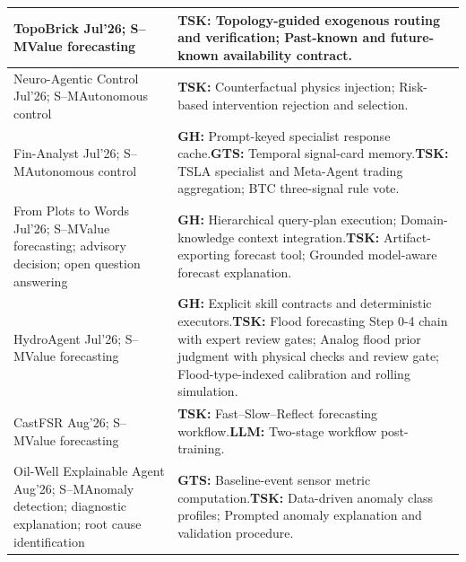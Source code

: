 \documentclass[preprints,article,submit,moreauthors]{Definitions/mdpi}
\newcommand{\typeSMshort}{\textsf{S--M}}
\begin{document}
\begin{longtable}{@{}>{\raggedright\arraybackslash}p{}p{}@{}}
TopoBrick \citep{topobrick2026} Jul'26; \typeSMshort{}\newline Value forecasting & \textbf{TSK:} Topology-guided exogenous routing and verification; Past-known and future-known availability contract.\\\midrule
Neuro-Agentic Control \citep{neuroagentic2026} Jul'26; \typeSMshort{}\newline Autonomous control & \textbf{TSK:} Counterfactual physics injection; Risk-based intervention rejection and selection.\\\midrule
Fin-Analyst \citep{finanalyst2026} Jul'26; \typeSMshort{}\newline Autonomous control & \textbf{GH:} Prompt-keyed specialist response cache.\newline\textbf{GTS:} Temporal signal-card memory.\newline\textbf{TSK:} TSLA specialist and Meta-Agent trading aggregation; BTC three-signal rule vote.\\\midrule
From Plots to Words \citep{plotstowords2026} Jul'26; \typeSMshort{}\newline Value forecasting; advisory decision; open question answering & \textbf{GH:} Hierarchical query-plan execution; Domain-knowledge context integration.\newline\textbf{TSK:} Artifact-exporting forecast tool; Grounded model-aware forecast explanation.\\\midrule
HydroAgent \citep{hydroagent2026} Jul'26; \typeSMshort{}\newline Value forecasting & \textbf{GH:} Explicit skill contracts and deterministic executors.\newline\textbf{TSK:} Flood forecasting Step 0-4 chain with expert review gates; Analog flood prior judgment with physical checks and review gate; Flood-type-indexed calibration and rolling simulation.\\\midrule
CastFSR \citep{castfsr2026} Aug'26; \typeSMshort{}\newline Value forecasting & \textbf{TSK:} Fast--Slow--Reflect forecasting workflow.\newline\textbf{LLM:} Two-stage workflow post-training.\\\midrule
Oil-Well Explainable Agent \citep{oilwellagent2026} Aug'26; \typeSMshort{}\newline Anomaly detection; diagnostic explanation; root cause identification & \textbf{GTS:} Baseline-event sensor metric computation.\newline\textbf{TSK:} Data-driven anomaly class profiles; Prompted anomaly explanation and validation procedure.\\\midrule

\end{longtable}
\end{document}

